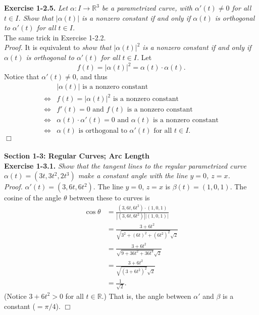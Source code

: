 \documentclass{article}
\begin{document}
\textbf{Exercise 1-2.5.}
\emph{Let $\alpha: I \to \mathbb{R}^3$ be a parametrized curve,
with $\alpha'(t) \neq 0$ for all $t \in I$.
Show that $|\alpha(t)|$ is a nonzero constant
if and only if
$\alpha(t)$ is orthogonal to $\alpha'(t)$ for all $t \in I$.} \\

The same trick in Exercise 1-2.2. \\

\emph{Proof.}
It is equivalent to
\emph{show that $|\alpha(t)|^2$ is a nonzero constant
if and only if
$\alpha(t)$ is orthogonal to $\alpha'(t)$ for all $t \in I$.}
Let $$f(t) = |\alpha(t)|^2 = \alpha(t) \cdot \alpha(t).$$
Notice that $\alpha'(t) \neq 0$, and thus
\begin{align*}
&|\alpha(t)| \text{ is a nonzero constant} \\
\Longleftrightarrow&
f(t) = |\alpha(t)|^2 \text{ is a nonzero constant} \\
\Longleftrightarrow&
f'(t) = 0 \text{ and } f(t) \text{ is a nonzero constant} \\
\Longleftrightarrow&
\alpha(t) \cdot \alpha'(t) = 0 \text{ and } \alpha(t) \text{ is a nonzero constant} \\
\Longleftrightarrow&
\alpha(t) \text{ is orthogonal to } \alpha'(t) \text{ for all } t \in I.
\end{align*}
$\Box$ \\\\







\textbf{\large Section 1-3: Regular Curves; Arc Length} \\



\textbf{Exercise 1-3.1.}
\emph{Show that the tangent lines to the regular parametrized curve
$\alpha(t) = (3t, 3t^2, 2t^3)$ make a constant angle with the line $y = 0$, $z = x$. } \\

\emph{Proof.}
$\alpha'(t) = (3, 6t, 6t^2)$.
The line $y = 0$, $z = x$ is $\beta(t) = (1,0,1)$.
The cosine of the angle $\theta$ between these to curves is
\begin{align*}
\cos \theta
&= \frac{(3, 6t, 6t^2) \cdot (1,0,1)}{|(3, 6t, 6t^2)||(1,0,1)|} \\
&= \frac{3+6t^2}{\sqrt{3^2 + (6t)^2 + (6t^2)^2}\sqrt{2}} \\
&= \frac{3+6t^2}{\sqrt{9 + 36 t^2 + 36t^4}\sqrt{2}} \\
&= \frac{3+6t^2}{\sqrt{(3 + 6t^2)^2}\sqrt{2}} \\
&= \frac{1}{\sqrt{2}}.
\end{align*}
(Notice $3 + 6t^2 > 0$ for all $t \in \mathbb{R}$.)
That is, the angle between $\alpha'$ and $\beta$ is a constant ($= \pi/4$).
$\Box$ \\\\
\end{document}
